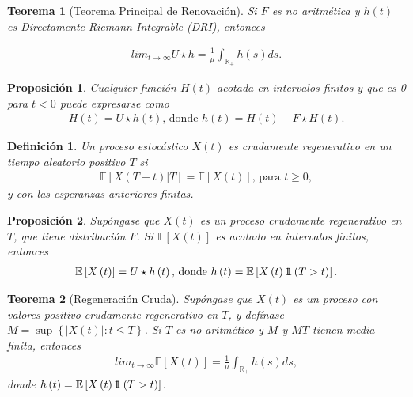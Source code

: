 \documentclass{article}
\newtheorem{Def}{Definición}[section]
\newtheorem{Teo}{Teorema}%
\newtheorem{Prop}{Proposición}%
\newcommand{\rea}{\mathbb{R}}
\newcommand{\esp}{\mathbb{E}}
\newcommand{\indora}{\mbox{$1$\hspace{-0.8ex}$1$}}
\numberwithin{equation}{section}
\begin{document}
\begin{Teo}[Teorema Principal de Renovaci\'on]
Si $F$ es no aritm\'etica y $h\left(t\right)$ es Directamente Riemann Integrable (DRI), entonces

\begin{eqnarray}
lim_{t\rightarrow\infty}U\star h=\frac{1}{\mu}\int_{\rea_{+}}h\left(s\right)ds.
\end{eqnarray}
\end{Teo}

\begin{Prop}
Cualquier funci\'on $H\left(t\right)$ acotada en intervalos finitos y que es 0 para $t<0$ puede expresarse como
\begin{eqnarray}
H\left(t\right)=U\star h\left(t\right)\textrm{,  donde }h\left(t\right)=H\left(t\right)-F\star H\left(t\right).
\end{eqnarray}
\end{Prop}

\begin{Def}
Un proceso estoc\'astico $X\left(t\right)$ es crudamente regenerativo en un tiempo aleatorio positivo $T$ si
\begin{eqnarray}
\esp\left[X\left(T+t\right)|T\right]=\esp\left[X\left(t\right)\right]\textrm{, para }t\geq0,\end{eqnarray}
y con las esperanzas anteriores finitas.
\end{Def}

\begin{Prop}
Sup\'ongase que $X\left(t\right)$ es un proceso crudamente regenerativo en $T$, que tiene distribuci\'on $F$. Si $\esp\left[X\left(t\right)\right]$ es acotado en intervalos finitos, entonces
\begin{eqnarray}
\esp\left[X\left(t\right)\right]=U\star h\left(t\right)\textrm{,  donde }h\left(t\right)=\esp\left[X\left(t\right)\indora\left(T>t\right)\right].
\end{eqnarray}
\end{Prop}

\begin{Teo}[Regeneraci\'on Cruda]
Sup\'ongase que $X\left(t\right)$ es un proceso con valores positivo crudamente regenerativo en $T$, y def\'inase $M=\sup\left\{|X\left(t\right)|:t\leq T\right\}$. Si $T$ es no aritm\'etico y $M$ y $MT$ tienen media finita, entonces
\begin{eqnarray}
lim_{t\rightarrow\infty}\esp\left[X\left(t\right)\right]=\frac{1}{\mu}\int_{\rea_{+}}h\left(s\right)ds,
\end{eqnarray}
donde $h\left(t\right)=\esp\left[X\left(t\right)\indora\left(T>t\right)\right]$.
\end{Teo}
\end{document}

